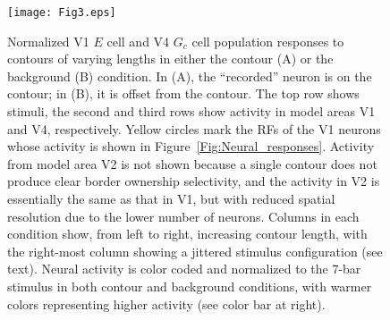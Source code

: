{\begin{figure}
\begin{center}
\texttt{[image: Fig3.eps]}
\end{center}
\caption{Normalized V1 $E$ cell and V4 $G_c$ cell population responses
 to contours of
varying lengths in either the contour (A) or the background (B)
condition. In (A), the ``recorded'' neuron is on the contour; in
(B), it is offset from the contour. The top row shows stimuli, the
second and third rows show activity in model areas 
V1 and V4, respectively. Yellow circles mark the RFs of the V1 neurons whose activity is shown in Figure~\ref{Fig:Neural_responses}.
Activity from model area V2 is not shown because a single contour does not produce clear border ownership selectivity, and the activity in V2 is essentially the same as that in V1, but with reduced spatial resolution due to the lower number of neurons. 
Columns in each condition show, from left to right, increasing
contour length, with the right-most column showing a jittered stimulus configuration (see text). Neural
activity is color coded
and normalized to the 7-bar stimulus in both contour and background conditions,
 with warmer colors representing higher
activity (see color bar at right). 
}
\label{Fig:Contour_Results}
\end{figure}

}
